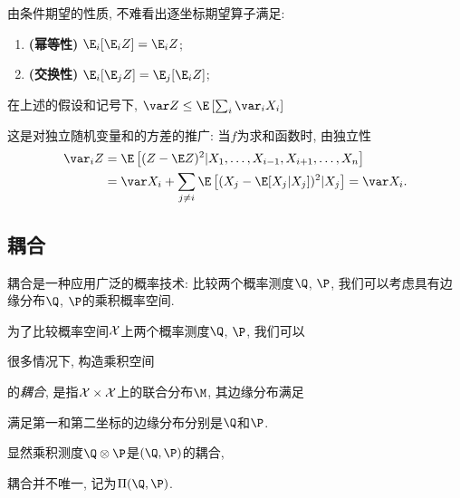 由条件期望的性质, 不难看出逐坐标期望算子满足:  
	\begin{enumerate}[label=(\roman*)]
		\item \textbf{(幂等性)} $\E_i[\E_i Z] = \E_i Z$; 
		\item \textbf{(交换性)} $\E_i[\E_j Z] = \E_j [\E_i Z]$; 
	\end{enumerate}

\begin{theorem}[方差的张量化]
	在上述的假设和记号下, $\var Z \leq \E \left[ \sum_i \var_i X_i \right]$
\end{theorem}

\begin{remark}
	这是对独立随机变量和的方差的推广: 当$f$为求和函数时, 由独立性
	\begin{align*}
		\var_i Z 
		&= \E \left[ (Z - \E Z)^2 | X_1, \dots, X_{i-1}, X_{i+1}, \dots, X_n \right] \\
		&= \var X_i + \sum_{j \neq i} \E \left[ (X_j - \E[X_j | X_j] )^2 | X_j \right]
		= \var X_i. 
	\end{align*}
\end{remark}



\subsection{耦合}

耦合是一种应用广泛的概率技术: 比较两个概率测度$\Q$, $\P$, 我们可以考虑具有边缘分布$\Q$, $\P$的乘积概率空间. 

为了比较概率空间$\mathcal{X}$上两个概率测度$\Q$, $\P$, 我们可以

很多情况下, 构造乘积空间

的\emph{耦合}, 是指$\mathcal{X} \times \mathcal{X}$上的联合分布$\M$, 其边缘分布满足

满足第一和第二坐标的边缘分布分别是$\Q$和$\P$.


显然乘积测度$\Q \otimes \P$是$(\Q, \P)$的耦合, 

耦合并不唯一, 记为$\Pi(\Q, \P)$. 
